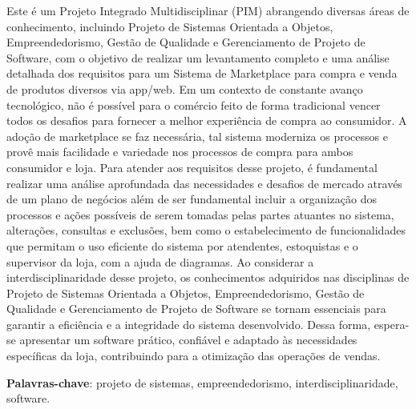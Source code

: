 \documentclass[
	12pt,				%
	openright,			%
	twoside,			%
	a4paper,			%
	english,			%
	brazil				%
	]{abntex2}
\begin{document}
\setlength{\absparsep}{18pt} %
\begin{resumo}
	Este é um Projeto Integrado Multidisciplinar (PIM) abrangendo diversas áreas de conhecimento, incluindo Projeto de Sistemas Orientada a Objetos, Empreendedorismo, Gestão de Qualidade e Gerenciamento de Projeto de Software, com o objetivo de realizar um levantamento completo e uma análise detalhada dos requisitos para um Sistema de Marketplace para compra e venda de produtos diversos via app/web. Em um contexto de constante avanço tecnológico, não é possível para o comércio feito de forma tradicional vencer todos os desafios para fornecer a melhor experiência de compra ao consumidor. A adoção de marketplace se faz necessária, tal sistema moderniza os processos e provê mais facilidade e variedade nos processos de compra para ambos consumidor e loja. Para atender aos requisitos desse projeto, é fundamental realizar uma análise aprofundada das necessidades e desafios de mercado através de um plano de negócios além de ser fundamental incluir a organização dos processos e ações possíveis de serem tomadas pelas partes atuantes no sistema, alterações, consultas e exclusões, bem como o estabelecimento de funcionalidades que permitam o uso eficiente do sistema por atendentes, estoquistas e o supervisor da loja, com a ajuda de diagramas. Ao considerar a interdisciplinaridade desse projeto, os conhecimentos adquiridos nas disciplinas de Projeto de Sistemas Orientada a Objetos, Empreendedorismo, Gestão de Qualidade e Gerenciamento de Projeto de Software se tornam essenciais para garantir a eficiência e a integridade do sistema desenvolvido. Dessa forma, espera-se apresentar um software prático, confiável e adaptado às necessidades específicas da loja, contribuindo para a otimização das operações de vendas.

 \textbf{Palavras-chave}: projeto de sistemas, empreendedorismo, interdisciplinaridade, software.
\end{resumo}
\end{document}
